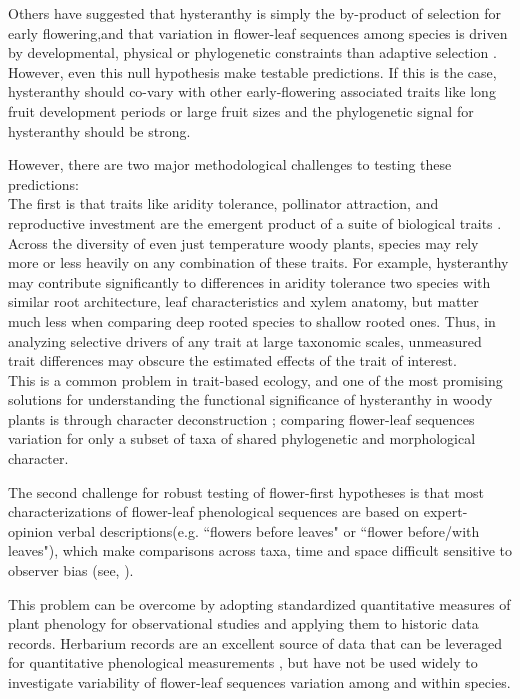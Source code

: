 \documentclass{article}\usepackage[]{graphicx}\usepackage[]{color}
\begin{document}
\noindent Others have suggested that hysteranthy is simply the by-product of selection for early flowering,and that variation in flower-leaf sequences among species is driven by developmental, physical or phylogenetic constraints than adaptive selection \citep{}. However, even this null hypothesis make testable predictions. If this is the case, hysteranthy should co-vary with other early-flowering associated traits like long fruit development periods or large fruit sizes \citep{} and the phylogenetic signal for hysteranthy should be strong.

\noindent However, there are two major methodological challenges to testing these predictions:\\

The first is that traits like aridity tolerance, pollinator attraction, and reproductive investment are the emergent product of a suite of biological traits \citep{}. Across the diversity of even just temperature woody plants, species may rely more or less heavily on any combination of these traits. For example, hysteranthy may contribute significantly to differences in aridity tolerance two species with similar root architecture, leaf characteristics and xylem anatomy, but matter much less when comparing deep rooted species to shallow rooted ones. Thus, in analyzing selective drivers of any trait at large taxonomic scales, unmeasured trait differences may obscure the estimated effects of the trait of interest.\\

This is a common problem in trait-based ecology, and one of the most promising solutions for understanding the functional significance of hysteranthy in woody plants is through character deconstruction \citep{}; comparing flower-leaf sequences variation for only a subset of taxa of shared phylogenetic and morphological character.   


The second challenge for robust testing of flower-first hypotheses is that most characterizations of flower-leaf phenological sequences are based on expert-opinion verbal descriptions(e.g. ``flowers before leaves" or ``flower before/with leaves"), which make comparisons across taxa, time and space difficult sensitive to observer bias (see, \citep{}). 

This problem can be overcome by adopting standardized quantitative measures of plant phenology for observational studies and applying them to historic data records. Herbarium records are an excellent source of data that can be leveraged for quantitative phenological measurements \citep{}, but have not be used widely to investigate variability of flower-leaf sequences variation among and within species.
\end{document}
